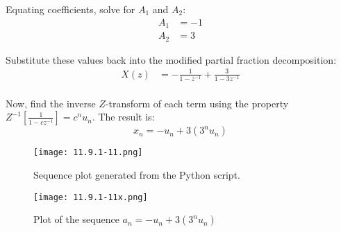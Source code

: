 \documentclass[12pt]{article}
\begin{document}
Equating coefficients, solve for \(A_1\) and \(A_2\):
\begin{align*}
A_1 &= -1 \\
A_2 &= 3
\end{align*}

Substitute these values back into the modified partial fraction decomposition:
\begin{align*}
X(z) &= -\frac{1}{1-z^{-1}} + \frac{3}{1-3z^{-1}} \\
\end{align*}

Now, find the inverse \(Z\)-transform of each term using the property \(Z^{-1}\left[\frac{1}{1-cz^{-1}}\right] = c^n u_n\). The result is:
\begin{equation}
x_n = -u_n + 3(3^n u_n)
\end{equation}

\begin{figure}[h]
    \centering
    \texttt{[image: 11.9.1-11.png]}
    \caption{Sequence plot generated from the Python script.}
    \label{fig:sequence-plot}
\end{figure}

\begin{figure}[h]
  \centering
  \texttt{[image: 11.9.1-11x.png]} %
  \caption{Plot of the sequence \(a_n = -u_n + 3(3^n u_n)\)}
  \label{fig:sequence_plot}
\end{figure}
\end{document}
